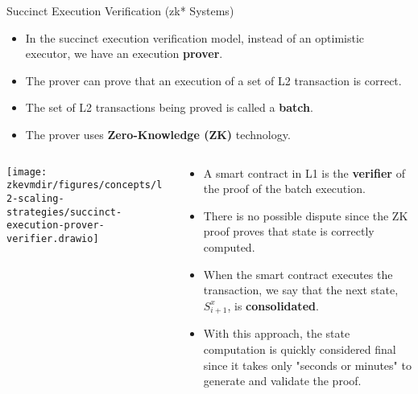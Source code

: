 \begin{frame}[t]{Succinct Execution Verification (zk* Systems)}
\begin{itemize}
\small
\item In the succinct execution verification model, instead of an optimistic executor,
we have an execution \textbf{prover}.
\item The prover can prove that an execution of a set of L2 transaction is correct.
\item The set of L2 transactions being proved is called a \textbf{batch}.
\item The prover uses \textbf{Zero-Knowledge (ZK)} technology.
\end{itemize}

\begin{columns}
\begin{column}{0.4\textwidth}
\centering
\texttt{[image: \\zkevmdir/figures/concepts/l2-scaling-strategies/succinct-execution-prover-verifier.drawio]}
\end{column}
\begin{column}{0.6\textwidth}
\begin{itemize}
\small
\item A smart contract in L1 is the \textbf{verifier} of the proof of the batch execution.
\item There is no possible dispute since the ZK proof proves that state is correctly computed.
\item When the smart contract executes the transaction, we say that the next state, $S^x_{i+1}$, is \textbf{consolidated}.
\item With this approach, the state computation is quickly considered final since
it takes only "seconds or minutes" to generate and validate the proof.
\end{itemize}
\end{column}
\end{columns}
\end{frame}






